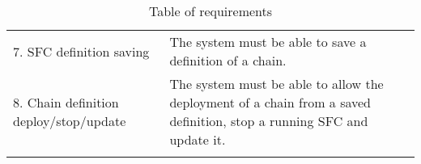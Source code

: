 \begin{longtable}[c]{p{}p{}}
7. SFC definition saving                                                & The system must be able to save a definition of a chain.                                                                                                                                        \\
8. Chain definition deploy/stop/update                    & The system must be able to allow the deployment of a chain from a saved definition, stop a running SFC and update it.                                                                          \\ \hline
\caption{Table of requirements}
\label{chap:prjan:tab:req}\\
\end{longtable}
